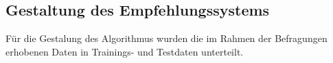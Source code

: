 
\subsection{Gestaltung des Empfehlungssystems}
Für die Gestalung des Algorithmus wurden die im Rahmen der Befragungen erhobenen Daten in Trainings- und Testdaten unterteilt.



